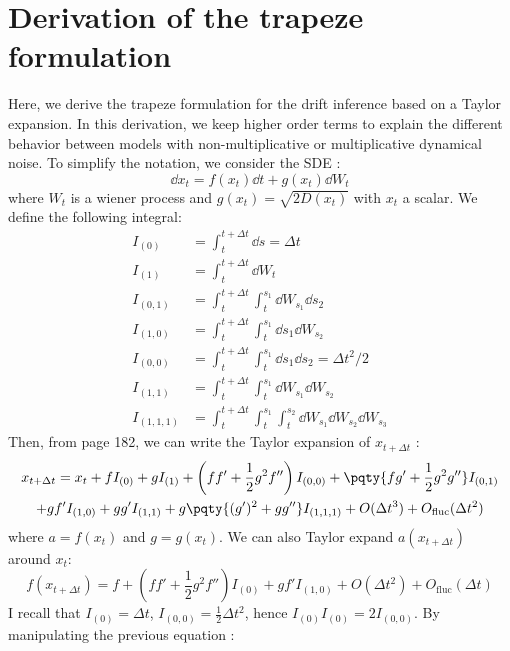 \chapter{Derivation of the trapeze formulation}
Here, we derive the trapeze formulation for the drift inference based on a Taylor expansion. In this derivation, we keep higher order terms to explain the different behavior between models with non-multiplicative or multiplicative dynamical noise. To simplify the notation, we consider the SDE :
\begin{equation}
    \dd{x_t} = f(x_t) \dd{t}  + g(x_t)\dd{W_t}
\end{equation}
where $W_t$ is a wiener process and $g(x_t) = \sqrt{2 D(x_t)}$ with $x_t$ a scalar. We define the following integral:
\begin{align}
    I_{(0)} &= \int_t^{t+\Delta t}\dd{s} = \Delta t\\
    I_{(1)} &= \int_t^{t+\Delta t} \dd{W_t}\\
    I_{(0,1)} &= \int_t^{t+\Delta t} \int_t^{s_1} \dd{W_{s_1}} \dd{s_2}\\
    I_{(1,0)} &= \int_t^{t+\Delta t} \int_t^{s_1} \dd{s_1} \dd{W_{s_2}}\\
    I_{(0,0)} &= \int_t^{t+\Delta t} \int_t^{s_1} \dd{s_1} \dd{s_2} = \Delta t^2 / 2\\
    I_{(1,1)} &=  \int_t^{t+\Delta t} \int_t^{s_1} \dd{W_{s_1}} \dd{W_{s_2}}\\
    I_{(1,1,1)} &=  \int_t^{t+\Delta t} \int_t^{s_1} \int_t^{s_2}\dd{W_{s_1}} \dd{W_{s_2}}\dd{W_{s_3}}
\end{align}
 Then, from \cite{kloedenStochasticTaylorExpansions1992} page 182, we can write the Taylor expansion of $x_{t+\Delta t}$ :
\begin{multline}
    x_{t+\Delta t} = x_{t} + f I_{(0)} + g I_{(1)} + \left(f f' + \frac{1}{2}g^2 f''\right)I_{(0,0)} + \pqty{fg'+ \frac{1}{2} g^2 g''} I_{(0,1)}\\
    + g f' I_{(1,0)} + gg' I_{(1,1)} + g\pqty{(g')^2 + g g''} I_{(1,1,1)} + O(\Delta t^3) + O_\text{fluc}(\Delta t^{2})
    \label{eq:appendix_taylor_x}
\end{multline}
where $a = f(x_t)$ and $g = g(x_t)$. We can also Taylor expand $a(x_{t+ \Delta t})$ around $x_t$:
\begin{equation}
    f(x_{t+\Delta t}) = f + \left(f f' + \frac{1}{2}g^2 f''\right)I_{(0)} 
    + g f' I_{(1,0)} + O(\Delta t^2) + O_\text{fluc}(\Delta t)
\end{equation}
I recall that $I_{(0)} = \Delta t$, $I_{(0,0)} = \frac{1}{2} \Delta t^2$, hence $I_{(0)} I_{(0)} = 2 I_{(0,0)}$. By manipulating the previous equation : 

